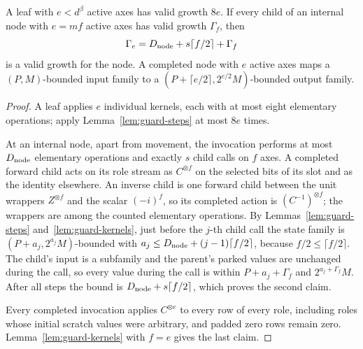 \begin{lemma}\label{lem:guard-node}
A leaf with $e<d^\beta$ active axes has valid growth $8e$. If every child of an
internal node with $e=mf$ active axes has valid growth $\Gamma_f$, then
\[
 \Gamma_e=D_{\rm node}+s\lceil f/2\rceil+\Gamma_f
\]
is a valid growth for the node. A completed node with $e$ active axes maps a
$(P,M)$-bounded input family to a $(P+\lceil e/2\rceil,2^{e/2}M)$-bounded
output family.
\end{lemma}
\begin{proof}
A leaf applies $e$ individual kernels, each with at most eight elementary
operations; apply Lemma~\ref{lem:guard-steps} at most $8e$ times.

At an internal node, apart from movement, the invocation performs at most
$D_{\rm node}$ elementary operations and exactly $s$ child calls on $f$ axes.
A completed forward child acts on its role stream as $C^{\otimes f}$ on the
selected bits of its slot and as the identity elsewhere. An inverse child is
one forward child between the unit wrappers $Z^{\otimes f}$ and the scalar
$(-i)^f$, so its completed action is $(C^{-1})^{\otimes f}$; the wrappers are
among the counted elementary operations. By Lemmas~\ref{lem:guard-steps}
and~\ref{lem:guard-kernels}, just before the $j$-th child call the state
family is $(P+a_j,2^{a_j}M)$-bounded with
$a_j\le D_{\rm node}+(j-1)\lceil f/2\rceil$, because $f/2\le\lceil f/2\rceil$.
The child's input is a subfamily and the parent's parked values are unchanged
during the call, so every value during the call is within
$P+a_j+\Gamma_f$ and $2^{a_j+\Gamma_f}M$. After all steps the bound is
$D_{\rm node}+s\lceil f/2\rceil$, which proves the second claim.

Every completed invocation applies $C^{\otimes e}$ to every row of every
role, including roles whose initial scratch values were arbitrary, and
padded zero rows remain zero. Lemma~\ref{lem:guard-kernels} with $f=e$ gives
the last claim.
\end{proof}

